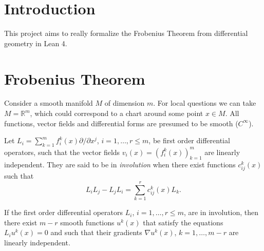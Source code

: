 %

\chapter{Introduction}

This project aims to really formalize the Frobenius Theorem from differential geometry in Lean 4.

\chapter{Frobenius Theorem}

Consider a smooth manifold $M$ of dimension $m$. For local questions we can take
$M=\mathbb{R}^m$, which could correspond to a chart around some point $x\in M$.
All functions, vector fields and differential forms are presumed to be smooth ($C^\infty$).

\begin{definition}[involutivity] \label{def:invol}
Let $L_i = \sum_{k=1}^m f_i^k(x) \partial/\partial x^j$, $i=1,\ldots,r\le m$, be
first order differential operators, such that the vector fields $v_i(x) =
(f_i^k(x))_{k=1}^m$ are linearly independent. They are said to be in
\emph{involution} when there exist functions $c^k_{ij}(x)$ such that
\[
  L_i L_j - L_j L_i = \sum_{k=1}^r c^k_{ij}(x) L_k .
\]
\end{definition}

\begin{theorem} \label{thm:frob-loc}
If the first order differential operators $L_i$, $i=1,\ldots,r \le m$, are in
involution, then there exist $m-r$ smooth functions $u^k(x)$ that satisfy the
equations $L_i u^k(x) = 0$ and such that their gradients $\nabla u^k(x)$,
$k=1,\ldots,m-r$ are linearly independent.
\end{theorem}

